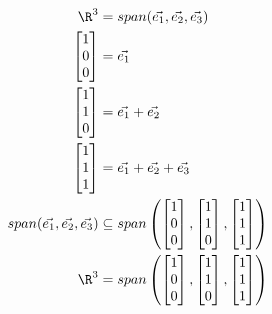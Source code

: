 \documentclass[letterpaper, 12pt]{math}
\begin{document}
\begin{align*}
  \R^3 &= span(\vec{e_1},\vec{e_2},\vec{e_3}) \\
  \begin{bmatrix}1 \\ 0 \\ 0\end{bmatrix} &= \vec{e_1} \\
  \begin{bmatrix}1 \\ 1 \\ 0\end{bmatrix} &= \vec{e_1}+\vec{e_2} \\
  \begin{bmatrix}1 \\ 1 \\ 1\end{bmatrix} &= \vec{e_1}+\vec{e_2}+\vec{e_3} \\
  span(\vec{e_1},\vec{e_2},\vec{e_3}) &\subseteq span\left(
    \begin{bmatrix}1 \\ 0 \\ 0\end{bmatrix},
    \begin{bmatrix}1 \\ 1 \\ 0\end{bmatrix},
    \begin{bmatrix}1 \\ 1 \\ 1\end{bmatrix}\right) \\
  \R^3 &= span\left(
    \begin{bmatrix}1 \\ 0 \\ 0\end{bmatrix},
    \begin{bmatrix}1 \\ 1 \\ 0\end{bmatrix},
    \begin{bmatrix}1 \\ 1 \\ 1\end{bmatrix}\right)
\end{align*}
\end{document}
